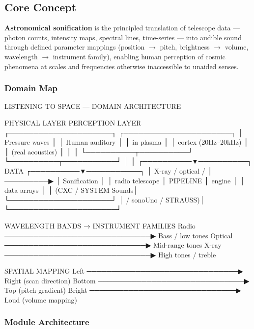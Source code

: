 \documentclass[11pt,letterpaper]{article}
\begin{document}
\subsection{Core Concept}

\textbf{Astronomical sonification} is the principled translation of telescope data — photon counts, intensity maps, spectral lines, time-series — into audible sound through defined parameter mappings (position $\rightarrow$ pitch, brightness $\rightarrow$ volume, wavelength $\rightarrow$ instrument family), enabling human perception of cosmic phenomena at scales and frequencies otherwise inaccessible to unaided senses.

\subsubsection{Domain Map}

\begin{asciibox}
LISTENING TO SPACE — DOMAIN ARCHITECTURE

   PHYSICAL LAYER                    PERCEPTION LAYER
   ┌─────────────────────┐           ┌──────────────────────┐
   │  Pressure waves     │           │  Human auditory       │
   │  in plasma          │           │  cortex (20Hz–20kHz) │
   │  (real acoustics)   │           │                      │
   └──────────┬──────────┘           └──────────┬───────────┘
              │                                  │
   ┌──────────▼──────────┐    DATA    ┌──────────▼───────────┐
   │  X-ray / optical /  │ ─────────▶ │  Sonification        │
   │  radio telescope    │  PIPELINE  │  engine              │
   │  data arrays        │            │  (CXC / SYSTEM Sounds│
   └─────────────────────┘            │  / sonoUno / STRAUSS)│
                                      └──────────────────────┘

   WAVELENGTH BANDS → INSTRUMENT FAMILIES
   Radio  ──────────────────────────────▶ Bass / low tones
   Optical ─────────────────────────────▶ Mid-range tones
   X-ray  ──────────────────────────────▶ High tones / treble

   SPATIAL MAPPING
   Left ───────────────────────────────▶ Right (scan direction)
   Bottom ──────────────────────────────▶ Top (pitch gradient)
   Bright ──────────────────────────────▶ Loud (volume mapping)
\end{asciibox}

\subsubsection{Module Architecture}
\end{document}
